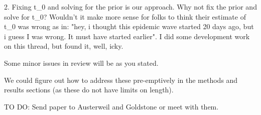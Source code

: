 2. Fixing t_0 and solving for the prior is our approach.  Why not fix the prior and solve for t_0?   Wouldn't it make more sense for folks to think their estimate of t_0 was wrong as in:  "hey, i thought this epidemic wave started 20 days ago, but i guess I was wrong.  It must have started earlier".   I did some development work on this thread, but found it, well, icky.  

Some minor issues in review will be as you stated.

We could figure out how to address these pre-emptively in the methods and results sections (as these do not have limits on length).



TO DO:
Send paper to Austerweil and Goldstone or meet with them.